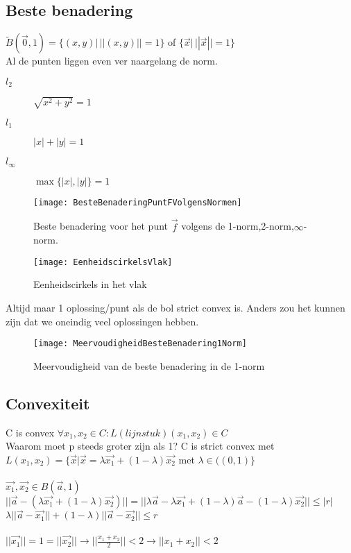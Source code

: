 \subsection{Beste benadering}
$\tilde{B}(\vec{0},1)=\{(x,y)| \, ||(x,y)||=1\}$ of $\{\vec{x}| \, ||\vec{x}||=1\}$ \\
Al de punten liggen even ver naargelang de norm.
\begin{description}
\item [$l_2$] $\sqrt{x^2+y^2}=1$
\item[$l_1$] $|x|+|y|=1$
\item [$l_\infty$] $\operatorname{max}\{{|x|,|y|}\}=1$
\end{description}
\begin{figure}[h]
	\centering
	\texttt{[image: BesteBenaderingPuntFVolgensNormen]}
	\caption{Beste benadering voor het punt $\vec{f}$ volgens de 1-norm,2-norm,$\infty$-norm.}
\end{figure}
\begin{figure}[h]
	\centering
	\texttt{[image: EenheidscirkelsVlak]}
	\caption{Eenheidscirkels in het vlak}
\end{figure}

Altijd maar 1 oplossing/punt als de bol strict convex is. Anders zou het kunnen zijn dat we oneindig veel oplossingen hebben.

\begin{figure}[h]
	\centering
	\texttt{[image: MeervoudigheidBesteBenadering1Norm]}
	\caption{Meervoudigheid van de beste benadering in de 1-norm}
\end{figure}

\subsection{Convexiteit} %
\begin{exam} 
C is convex $\forall x_1,x_2 \in C: L(lijnstuk)(x_1,x_2) \in C $ \\
Waarom moet p steeds groter zijn als 1?
C is strict convex met $L(x_1,x_2)=\{\vec{x} | \vec{x} = \lambda \vec{x_1}+(1-\lambda) \vec{x_2} $ met $\lambda \in ((0,1) \}$ \\\\
$\vec{x_1},\vec{x_2} \in B(\vec{a},1)$ \\
$ ||\vec{a}-(\lambda\vec{x_1}+(1-\lambda)\vec{x_2})||=||\lambda\vec{a}-\lambda\vec{x_1}+(1-\lambda)\vec{a}-(1-\lambda)\vec{x_2}|| \leq |r|$ \\
$\lambda||\vec{a}-\vec{x_1}||+(1-\lambda)||\vec{a}-\vec{x_2}|| \leq r$ \\\\
$||\vec{x_1}|| = 1 = ||\vec{x_2}|| \rightarrow || \frac{x_1+x_2}{2} || <2 \rightarrow ||x_1+x_2||<2$
\end{exam}
